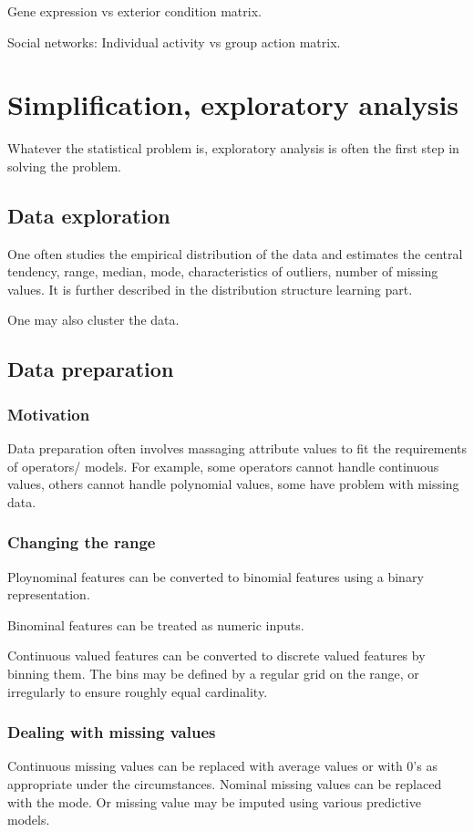 \documentclass[oneside, article]{memoir}
\begin{document}
Gene expression vs exterior condition matrix.

Social networks: Individual activity vs group action matrix.

\part{Simplification, exploratory analysis}
Whatever the statistical problem is, exploratory analysis is often the first step in solving the problem.

\chapter{Data exploration}
One often studies the empirical distribution of the data and estimates the central tendency, range, median, mode, characteristics of outliers, number of missing values. It is further described in the distribution structure learning part.

One may also cluster the data.

\chapter{Data preparation}
\section{Motivation}
Data preparation often involves massaging attribute values to fit the requirements of operators/ models. For example, some operators cannot handle continuous values, others cannot handle polynomial values, some have problem with missing data.

\section{Changing the range}
Ploynominal features can be converted to binomial features using a binary representation.

Binominal features can be treated as numeric inputs.

Continuous valued features can be converted to discrete valued features by binning them. The bins may be defined by a regular grid on the range, or irregularly to ensure roughly equal cardinality.

\section{Dealing with missing values}
Continuous missing values can be replaced with average values  or with 0's as appropriate under the circumstances. Nominal missing values can be replaced with the mode.
Or missing value may be imputed using various predictive models.
\end{document}
